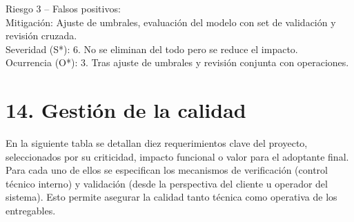 \documentclass[
11pt, %
]{charter}
\begin{document}
\vspace{0.2cm}
Riesgo 3 – Falsos positivos: \\
Mitigación: Ajuste de umbrales, evaluación del modelo con set de validación y revisión cruzada. \\
Severidad (S*): 6. No se eliminan del todo pero se reduce el impacto. \\
Ocurrencia (O*): 3. Tras ajuste de umbrales y revisión conjunta con operaciones.



\section{14. Gestión de la calidad}
\label{sec:calidad}

En la siguiente tabla se detallan diez requerimientos clave del proyecto, seleccionados por su criticidad, impacto funcional o valor para el adoptante final. Para cada uno de ellos se especifican los mecanismos de verificación (control técnico interno) y validación (desde la perspectiva del cliente u operador del sistema). Esto permite asegurar la calidad tanto técnica como operativa de los entregables.
\end{document}
